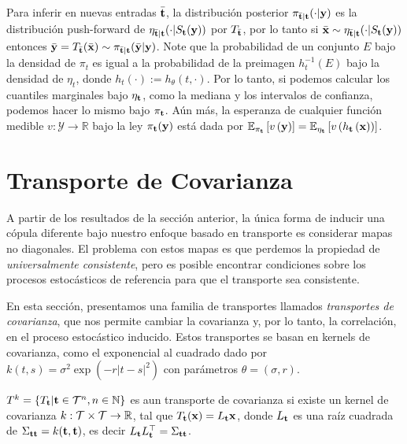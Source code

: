 Para inferir en nuevas entradas \(\bar{\mathbf{t}}\), la distribución posterior \(\pi_{\bar{\mathbf{t}}|\mathbf{t}}(\cdot|\mathbf{y})\) es la distribución push-forward de \(\eta_{\bar{\mathbf{t}}|\mathbf{t}}(\cdot|S_{\mathbf{t}}(\mathbf{y}))\) por \(T_{\bar{\mathbf{t}}}\), por lo tanto si \(\bar{\mathbf{x}} \sim \eta_{\bar{\mathbf{t}}|\mathbf{t}}(\cdot|S_{\mathbf{t}}(\mathbf{y}))\) entonces \(\bar{\mathbf{y}}=T_{\bar{\mathbf{t}}}(\bar{\mathbf{x}}) \sim \pi_{\bar{\mathbf{t}}|\mathbf{t}}(\bar{\mathbf{y}}|\mathbf{y})\). Note que la probabilidad de un conjunto \(E\) bajo la densidad de \(\pi_t\) es igual a la probabilidad de la preimagen \(h_t^{-1}(E)\) bajo la densidad de \(\eta_t\), donde \(h_t(\cdot) :=h_\theta(t, \cdot)\). Por lo tanto, si podemos calcular los cuantiles marginales bajo \(\eta_{\mathbf{t}}\), como la mediana y los intervalos de confianza, podemos hacer lo mismo bajo \(\pi_{\mathbf{t}}\). Aún más, la esperanza de cualquier función medible \(v:\mathcal{Y}\rightarrow \mathbb{R}\) bajo la ley \(\pi_{\mathbf{t}}(\mathbf{y})\) está dada por \(\mathbb{E}_{\pi_{\mathbf{t}}}\left[ v\left(\mathbf{y}\right)\right]  =\mathbb{E}_{\eta_{\mathbf{t}}}\left[v\left(h_{\mathbf{t}}\left( \mathbf{x}\right)\right) \right]\).



\section{Transporte de Covarianza}
\label{sec:covariancetransport}

A partir de los resultados de la sección anterior, la única forma de inducir una cópula diferente bajo nuestro enfoque basado en transporte es considerar mapas no diagonales. El problema con estos mapas es que perdemos la propiedad de \emph{universalmente consistente}, pero es posible encontrar condiciones sobre los procesos estocásticos de referencia para que el transporte sea consistente.

En esta sección, presentamos una familia de transportes llamados \emph{transportes de covarianza}, que nos permite cambiar la covarianza y, por lo tanto, la correlación, en el proceso estocástico inducido. Estos transportes se basan en kernels de covarianza, como el exponencial al cuadrado dado por \(k(t,s) = \sigma^2\exp(-r|t-s|^2)\) con parámetros \(\theta=(\sigma,r)\).

\begin{definition}
	\(T^k=\{T_{\mathbf{t}} | \mathbf{t} \in \mathcal{T}^n, n \in \mathbb{N}\}\) es aun transporte de covarianza si existe un kernel de covarianza \(k:\mathcal{T} \times \mathcal{T} \rightarrow \mathbb{R}\), tal que \(T_{\mathbf{t}}(\mathbf{x}) = L_{\mathbf{t}}\mathbf{x}\), donde \(L_{\mathbf{t}}\) es una raíz cuadrada de \(\Sigma_{\mathbf{t}\mathbf{t}} = k(\mathbf{t},\mathbf{t})\), es decir \(L_{\mathbf{t}}L_{\mathbf{t}}^\top = \Sigma_{\mathbf{t}\mathbf{t}}\).
\end{definition}

